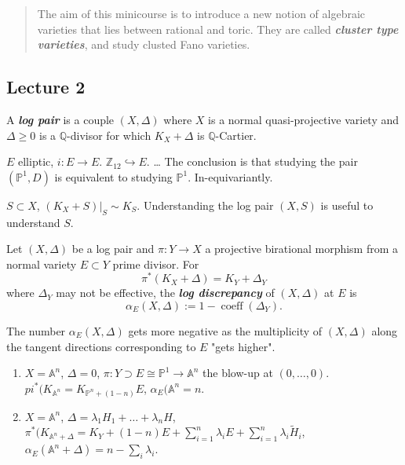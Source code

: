 \begin{quotation}
	The aim of this minicourse is to introduce a new notion of algebraic varieties that lies between rational and toric. They are called \textit{\textbf{cluster type varieties}}, and study clusted Fano varieties.
\end{quotation}

\subsection{Lecture 2}

\begin{defn}
	A \textit{\textbf{log pair}} is a couple  $(X,\Delta)$ where $X$ is a normal quasi-projective variety and $\Delta \geq 0$ is a $\mathbb{Q}$-divisor for which $K_{X}+\Delta$ is $\mathbb{Q}$-Cartier.
\end{defn}

\begin{example}
	$E$ elliptic, $i:E\to E$. $\mathbb{Z}_{12}\hookrightarrow E$. {\color{magenta}…} The conclusion is that studying the pair $(\mathbb{P}^{1},D)$ is equivalent to studying $\mathbb{P}^{1}$. In-equivariantly.
\end{example}

\begin{example}
	$S\subset X$, $(K_{X}+S)|_{S}\sim K_{S}$. Understanding the log pair $(X,S)$ is useful to understand $S$.
\end{example}

\begin{defn}
	Let $(X,\Delta )$ be a log pair and $\pi:Y\to  X$ a projective birational morphism from a normal variety $E\subset Y$ prime divisor. For
	\[\pi^{*}(K_{X}+\Delta )=K_{Y}+\Delta_{Y}\]
	where $\Delta_{Y}$ may not be effective, the \textit{\textbf{log discrepancy}} of $(X,\Delta )$ at $E$ is
	\[\alpha_{E}(X,\Delta ):=1-\operatorname{coeff}(\Delta_{Y}).\]
\end{defn}

\begin{remark}
	The number $\alpha_{E}(X,\Delta )$ gets more negative as the multiplicity of $(X,\Delta )$ along the tangent directions corresponding to $E$ "gets higher".
\end{remark}

\begin{example}
\begin{enumerate}\leavevmode 
	\item $X=\mathbb{A}^{n}$, $\Delta =0$, $\pi:Y\supset E\cong \mathbb{P}^{1}\to \mathbb{A}^{n}$ the blow-up at $(0,\ldots,0)$. $pi^{*}(K_{\mathbb{A}^{n}}=K_{\mathbb{P}^{n} +(1-n)}E$, $\alpha_{E}(\mathbb{A}^{n} =n$.
	\item $ X=\mathbb{A}^{n}$, $\Delta =\lambda_{1}H_{1}+\ldots+\lambda_{n}H$, $\pi^{*}(K_{\mathbb{A}^{n} +\Delta}=K_{Y}+(1-n)E+\sum_{i=1}^{n} \lambda_{i}E+\sum_{i=1}^{n} \lambda_{i}\tilde{H}_{i}$, $\alpha_{E}(\mathbb{A}^{n} +\Delta )=n-\sum_{i}\lambda_{i}$.
\end{enumerate}
\end{example}

